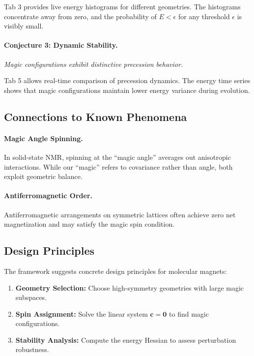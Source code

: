Tab 3 provides live energy histograms for different geometries. The histograms concentrate away from zero, and the probability of $E < \epsilon$ for any threshold $\epsilon$ is visibly small.

\paragraph{Conjecture 3: Dynamic Stability.}
\emph{Magic configurations exhibit distinctive precession behavior.}

Tab 5 allows real-time comparison of precession dynamics. The energy time series shows that magic configurations maintain lower energy variance during evolution.

\subsection{Connections to Known Phenomena}

\paragraph{Magic Angle Spinning.} In solid-state NMR, spinning at the ``magic angle'' averages out anisotropic interactions. While our ``magic'' refers to covariance rather than angle, both exploit geometric balance.

\paragraph{Antiferromagnetic Order.} Antiferromagnetic arrangements on symmetric lattices often achieve zero net magnetization and may satisfy the magic spin condition.

\subsection{Design Principles}

The framework suggests concrete design principles for molecular magnets:

\begin{enumerate}
    \item \textbf{Geometry Selection:} Choose high-symmetry geometries with large magic subspaces.
    \item \textbf{Spin Assignment:} Solve the linear system $\mathbf{c} = \mathbf{0}$ to find magic configurations.
    \item \textbf{Stability Analysis:} Compute the energy Hessian to assess perturbation robustness.
\end{enumerate}

